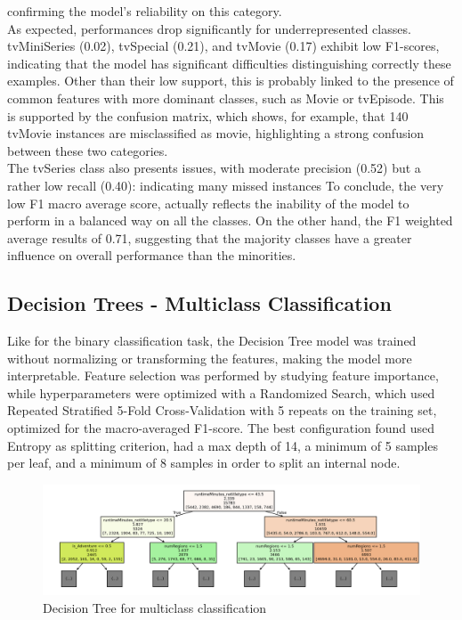 confirming the model's reliability on this category.\\
As expected, performances drop significantly for underrepresented classes. tvMiniSeries (0.02), tvSpecial (0.21), and tvMovie (0.17) exhibit low F1-scores, indicating that the model has significant difficulties distinguishing correctly these examples. 
Other than their low support, this is probably linked to the presence of common features with more dominant classes, such as Movie or tvEpisode. This is supported by the confusion matrix, which shows, for example, that 140 tvMovie instances are  misclassified as movie, highlighting a strong confusion between these two categories.\\
The tvSeries class also presents issues, with moderate precision (0.52) but a rather low recall (0.40): indicating many missed instances
To conclude, the very low F1 macro average score, actually reflects the inability of the model to perform in a balanced way on all the classes. 
On the other hand, the F1 weighted average results of 0.71, suggesting that the majority classes have a greater influence on overall performance than the minorities.



\subsection{Decision Trees - Multiclass Classification}
Like for the binary classification task, the Decision Tree model was trained without normalizing or
transforming the features, making the model more interpretable. Feature selection was performed by studying
feature importance, while hyperparameters were optimized with a Randomized Search,
which used Repeated Stratified 5-Fold Cross-Validation with 5 repeats on the training set, optimized for
the macro-averaged F1-score.
The best configuration found used Entropy as splitting criterion, had a max depth of 14, a minimum of
5 samples per leaf, and a minimum of 8 samples in order to split an internal node.
\begin{figure}[H]
    \centering
    \includegraphics[width=0.88\linewidth]{plots/multiclass_tree.png}
    \captionsetup{justification=centering, width=0.9\linewidth}
    \caption{Decision Tree for multiclass classification}
    \label{fig:multiclass_dt}
\end{figure}

